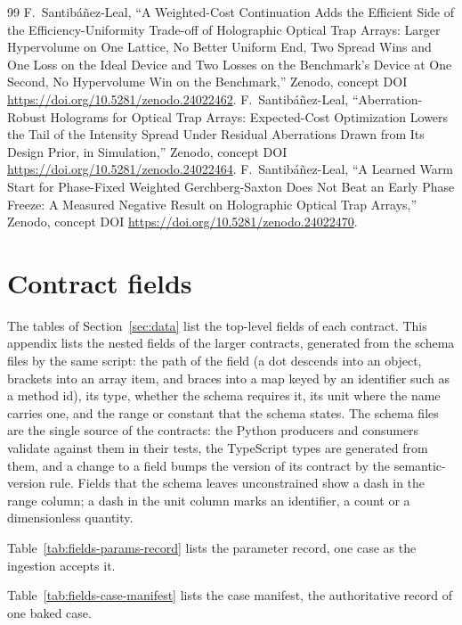 \begin{thebibliography}{99}
 F.~Santib\'a\~nez-Leal, ``A Weighted-Cost Continuation Adds the Efficient Side of the Efficiency-Uniformity Trade-off of Holographic Optical Trap Arrays: Larger Hypervolume on One Lattice, No Better Uniform End, Two Spread Wins and One Loss on the Ideal Device and Two Losses on the Benchmark's Device at One Second, No Hypervolume Win on the Benchmark,'' Zenodo, concept DOI \url{https://doi.org/10.5281/zenodo.24022462}.
 F.~Santib\'a\~nez-Leal, ``Aberration-Robust Holograms for Optical Trap Arrays: Expected-Cost Optimization Lowers the Tail of the Intensity Spread Under Residual Aberrations Drawn from Its Design Prior, in Simulation,'' Zenodo, concept DOI \url{https://doi.org/10.5281/zenodo.24022464}.
 F.~Santib\'a\~nez-Leal, ``A Learned Warm Start for Phase-Fixed Weighted Gerchberg-Saxton Does Not Beat an Early Phase Freeze: A Measured Negative Result on Holographic Optical Trap Arrays,'' Zenodo, concept DOI \url{https://doi.org/10.5281/zenodo.24022470}.
\end{thebibliography}

\appendix

\section{Contract fields}\label{app:fields}

The tables of Section~\ref{sec:data} list the top-level fields of each contract. This appendix lists the nested fields of the larger contracts, generated from the schema files by the same script: the path of the field (a dot descends into an object, brackets into an array item, and braces into a map keyed by an identifier such as a method id), its type, whether the schema requires it, its unit where the name carries one, and the range or constant that the schema states. The schema files are the single source of the contracts: the Python producers and consumers validate against them in their tests, the TypeScript types are generated from them, and a change to a field bumps the version of its contract by the semantic-version rule. Fields that the schema leaves unconstrained show a dash in the range column; a dash in the unit column marks an identifier, a count or a dimensionless quantity.

Table~\ref{tab:fields-params-record} lists the parameter record, one case as the ingestion accepts it.



Table~\ref{tab:fields-case-manifest} lists the case manifest, the authoritative record of one baked case.

